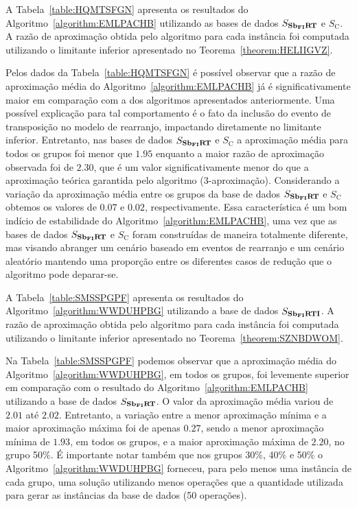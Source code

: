 A Tabela~\ref{table:HQMTSFGN} apresenta os resultados do Algoritmo~\ref{algorithm:EMLPACHB} utilizando as bases de dados $S_{\textbf{Sb\textsubscript{FI}RT}}{}$ e $S_{\text{C}}$. A razão de aproximação obtida pelo algoritmo para cada instância foi computada utilizando o limitante inferior apresentado no Teorema~\ref{theorem:HELIIGVZ}.



Pelos dados da Tabela~\ref{table:HQMTSFGN} é possível observar que a razão de aproximação média do Algoritmo~\ref{algorithm:EMLPACHB} já é significativamente maior em comparação com a dos algoritmos apresentados anteriormente. Uma possível explicação para tal comportamento é o fato da inclusão do evento de transposição no modelo de rearranjo, impactando diretamente no limitante inferior. Entretanto, nas bases de dados $S_{\textbf{Sb\textsubscript{FI}RT}}{}$ e $S_{\text{C}}$ a aproximação média para todos os grupos foi menor que $1.95$ enquanto a maior razão de aproximação observada foi de $2.30$, que é um valor significativamente menor do que a aproximação teórica garantida pelo algoritmo ($3$-aproximação). Considerando a variação da aproximação média entre os grupos da base de dados $S_{\textbf{Sb\textsubscript{FI}RT}}{}$ e $S_{\text{C}}$ obtemos os valores de $0.07$ e $0.02$, respectivamente. Essa característica é um bom indício de estabilidade do Algoritmo~\ref{algorithm:EMLPACHB}, uma vez que as bases de dados $S_{\textbf{Sb\textsubscript{FI}RT}}{}$ e $S_{\text{C}}$ foram construídas de maneira totalmente diferente, mas visando abranger um cenário baseado em eventos de rearranjo e um cenário aleatório mantendo uma proporção entre os diferentes casos de redução que o algoritmo pode deparar-se.

A Tabela~\ref{table:SMSSPGPF} apresenta os resultados do Algoritmo~\ref{algorithm:WWDUHPBG} utilizando a base de dados $S_{\textbf{Sb\textsubscript{FI}RTI}}{}$. A razão de aproximação obtida pelo algoritmo para cada instância foi computada utilizando o limitante inferior apresentado no Teorema~\ref{theorem:SZNBDWOM}.



Na Tabela~\ref{table:SMSSPGPF} podemos observar que a aproximação média do Algoritmo~\ref{algorithm:WWDUHPBG}, em todos os grupos, foi levemente superior em comparação com o resultado do Algoritmo~\ref{algorithm:EMLPACHB} utilizando a base de dados $S_{\textbf{Sb\textsubscript{FI}RT}}{}$. O valor da aproximação média variou de $2.01$ até $2.02$. Entretanto, a variação entre a menor aproximação mínima e a maior aproximação máxima foi de apenas $0.27$, sendo a menor aproximação mínima de $1.93$, em todos os grupos, e a maior aproximação máxima de $2.20$, no grupo 50\%. É importante notar também que nos grupos 30\%, 40\% e 50\%  o Algoritmo~\ref{algorithm:WWDUHPBG} forneceu, para pelo menos uma instância de cada grupo, uma solução utilizando menos operações que a quantidade utilizada para gerar as instâncias da base de dados (50 operações).

